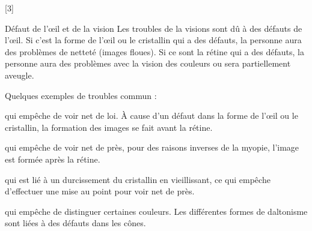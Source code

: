 [3]


\begin{doc}{Défaut de l'œil et de la vision}
  Les troubles de la visions sont dû à des défauts de l'œil.
  Si c'est la forme de l'œil ou le cristallin qui a des défauts, la personne aura des problèmes de netteté (images floues).
  Si ce sont la rétine qui a des défauts, la personne aura des problèmes avec la vision des couleurs ou sera partiellement aveugle.

  Quelques exemples de troubles commun :
  \begin{listePoints}
    \item {} qui empêche de voir net de loi. À cause d'un défaut dans la forme de l'œil ou le cristallin, la formation des images se fait avant la rétine.
    \item {} qui empêche de voir net de près, pour des raisons inverses de la myopie, l'image est formée après la rétine.
    \item {} qui est lié à un durcissement du cristallin en vieillissant, ce qui empêche d'effectuer une mise au point pour voir net de près.
    \item {} qui empêche de distinguer certaines couleurs. Les différentes formes de daltonisme sont liées à des défauts dans les cônes.
  \end{listePoints}
\end{doc}